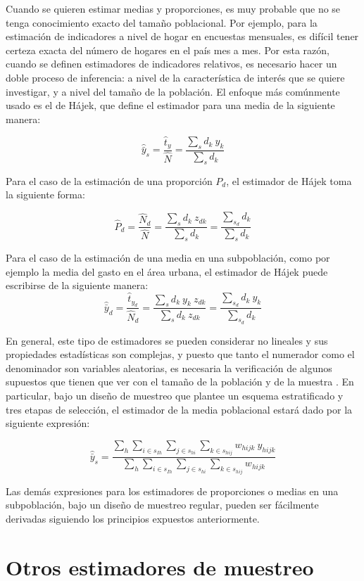 \documentclass[
  12pt,
]{book}
\begin{document}
Cuando se quieren estimar medias y proporciones, es muy probable que no se tenga conocimiento exacto del tamaño poblacional. Por ejemplo, para la estimación de indicadores a nivel de hogar en encuestas mensuales, es difícil tener certeza exacta del número de hogares en el país mes a mes. Por esta razón, cuando se definen estimadores de indicadores relativos, es necesario hacer un doble proceso de inferencia: a nivel de la característica de interés que se quiere investigar, y a nivel del tamaño de la población. El enfoque más comúnmente usado es el de Hájek, que define el estimador para una media de la siguiente manera:

\[
\hat{\bar{y}}_s=\frac{\hat t_y}{\hat N} = \frac{\sum_sd_k\ y_{k}}{\sum_sd_k}
\]

Para el caso de la estimación de una proporción \(P_d\), el estimador de Hájek toma la siguiente forma:

\[
\hat{P}_d=\frac{\hat N_d}{\hat N} = \frac{\sum_{s}d_k\ z_{dk}}{\sum_sd_k} = \frac{\sum_{s_d}d_k}{\sum_s d_k}
\]

Para el caso de la estimación de una media en una subpoblación, como por ejemplo la media del gasto en el área urbana, el estimador de Hájek puede escribirse de la siguiente manera:
\[
\hat{\bar{y}}_d=\frac{\hat t_{y_d}}{\hat N_d} = \frac{\sum_s d_k\ y_{k} \ z_{dk} }{\sum_s d_k \ z_{dk}} = \frac{\sum_{s_d} d_k\ y_{k}}{\sum_{s_d} d_k}
\]

En general, este tipo de estimadores se pueden considerar no lineales y sus propiedades estadísticas son complejas, y puesto que tanto el numerador como el denominador son variables aleatorias, es necesaria la verificación de algunos supuestos que tienen que ver con el tamaño de la población y de la muestra \citep{Gutierrez_2016}. En particular, bajo un diseño de muestreo que plantee un esquema estratificado y tres etapas de selección, el estimador de la media poblacional estará dado por la siguiente expresión:

\[
\hat{\bar{y}}_s=\frac{\sum_h \sum_{i \in s_{Ih}} \sum_{j \in s_{hi}} \sum_{k \in s_{hij}} w_{hijk} \ y_{hijk}}{\sum_h \sum_{i \in s_{Ih}} \sum_{j \in s_{hi}} \sum_{k \in s_{hij}} w_{hijk} }
\]

Las demás expresiones para los estimadores de proporciones o medias en una subpoblación, bajo un diseño de muestreo regular, pueden ser fácilmente derivadas siguiendo los principios expuestos anteriormente.

\hypertarget{otros-estimadores-de-muestreo}{%
\section{Otros estimadores de muestreo}\label{otros-estimadores-de-muestreo}}
\end{document}
